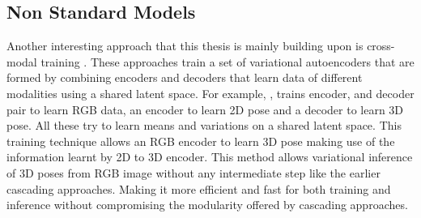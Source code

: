 \subsection{Non Standard Models}
Another interesting approach that this thesis is mainly building upon is cross-modal training \cite{CrossingNets, crossmodal}. These approaches train a set of variational autoencoders that are formed by combining encoders and decoders that learn data of different modalities using a shared latent space. For example, \cite{crossmodal}, trains encoder, and decoder pair to learn \ac{RGB} data, an encoder to learn 2D pose and a decoder to learn 3D pose. All these try to learn means and variations on a shared latent space. This training technique allows an \ac{RGB} encoder to learn 3D pose making use of the information learnt by 2D to 3D encoder. This method allows variational inference of 3D poses from \ac{RGB} image without any intermediate step like the earlier cascading approaches. Making it more efficient and fast for both training and inference without compromising the modularity offered by cascading approaches.






